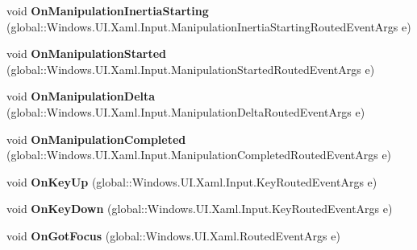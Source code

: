 \begin{DoxyCompactItemize}
void {\bfseries On\+Manipulation\+Inertia\+Starting} (global\+::\+Windows.\+U\+I.\+Xaml.\+Input.\+Manipulation\+Inertia\+Starting\+Routed\+Event\+Args e)
\item 
\mbox{\label{interface_windows_1_1_u_i_1_1_xaml_1_1_controls_1_1_i_control_overrides_ac3442eba714609f27fe4dd677f6f69cf}} 
void {\bfseries On\+Manipulation\+Started} (global\+::\+Windows.\+U\+I.\+Xaml.\+Input.\+Manipulation\+Started\+Routed\+Event\+Args e)
\item 
\mbox{\label{interface_windows_1_1_u_i_1_1_xaml_1_1_controls_1_1_i_control_overrides_a34e586f6a14135e204c81f1e9f6b5e18}} 
void {\bfseries On\+Manipulation\+Delta} (global\+::\+Windows.\+U\+I.\+Xaml.\+Input.\+Manipulation\+Delta\+Routed\+Event\+Args e)
\item 
\mbox{\label{interface_windows_1_1_u_i_1_1_xaml_1_1_controls_1_1_i_control_overrides_ab30d6aba08b80481dbb976080452f0f8}} 
void {\bfseries On\+Manipulation\+Completed} (global\+::\+Windows.\+U\+I.\+Xaml.\+Input.\+Manipulation\+Completed\+Routed\+Event\+Args e)
\item 
\mbox{\label{interface_windows_1_1_u_i_1_1_xaml_1_1_controls_1_1_i_control_overrides_ac591ce0737bcc8e2cf2c6b8bd5621e9d}} 
void {\bfseries On\+Key\+Up} (global\+::\+Windows.\+U\+I.\+Xaml.\+Input.\+Key\+Routed\+Event\+Args e)
\item 
\mbox{\label{interface_windows_1_1_u_i_1_1_xaml_1_1_controls_1_1_i_control_overrides_aeaad1b14fc6776a7f72fc9cd0adfd0bc}} 
void {\bfseries On\+Key\+Down} (global\+::\+Windows.\+U\+I.\+Xaml.\+Input.\+Key\+Routed\+Event\+Args e)
\item 
\mbox{\label{interface_windows_1_1_u_i_1_1_xaml_1_1_controls_1_1_i_control_overrides_a1c1a1e5d6fc39f32869c47a552212ee0}} 
void {\bfseries On\+Got\+Focus} (global\+::\+Windows.\+U\+I.\+Xaml.\+Routed\+Event\+Args e)
\item 

\end{DoxyCompactItemize}

